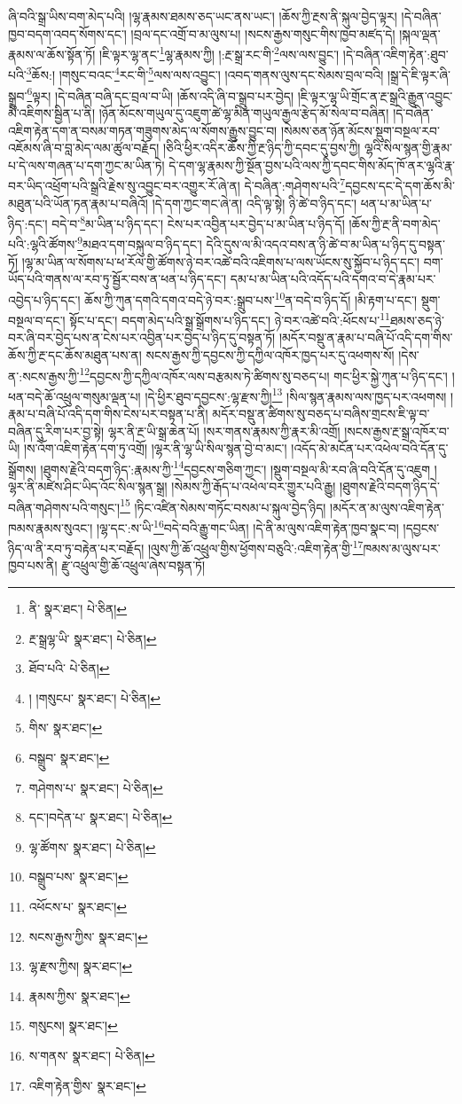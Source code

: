 ཞི་བའི་སྒྲ་ཡིས་བག་མེད་པའི། །ལྷ་རྣམས་ཐམས་ཅད་ཡང་ནས་ཡང་། །ཆོས་ཀྱི་རྔས་ནི་སྐུལ་བྱེད་ལྟར། །དེ་བཞིན་ཁྱབ་བདག་འབད་སོགས་དང་། །བྲལ་དང་འགྲོ་བ་མ་ལུས་པ། །སངས་རྒྱས་གསུང་གིས་ཁྱབ་མཛད་དེ། །སྐལ་ལྡན་རྣམས་ལ་ཆོས་སྟོན་ཏོ། །ཇི་ལྟར་ལྷ་ནང་\footnote{ནི་  སྣར་ཐང་།  པེ་ཅིན། }ལྷ་རྣམས་ཀྱི། །:རྔ་སྒྲ་རང་གི་\footnote{རྔ་སྒྲལྷ་ཡི་  སྣར་ཐང་།  པེ་ཅིན། }ལས་ལས་བྱུང་། །དེ་བཞིན་འཇིག་རྟེན་:ཐུབ་པའི་\footnote{ཐོབ་པའི་  པེ་ཅིན། }ཆོས:། །གསུང་བའང་\footnote{། །གསུངཔ་  སྣར་ཐང་།  པེ་ཅིན། }རང་གི་\footnote{གིས་  སྣར་ཐང་། }ལས་ལས་འབྱུང་། །འབད་གནས་ལུས་དང་སེམས་བྲལ་བའི། །སྒྲ་དེ་ཇི་ལྟར་ཞི་སྒྲུབ་\footnote{བསྒྲུབ་  སྣར་ཐང་། }ལྟར། །དེ་བཞིན་བཞི་དང་བྲལ་བ་ཡི། །ཆོས་འདི་ཞི་བ་སྒྲུབ་པར་བྱེད། །ཇི་ལྟར་ལྷ་ཡི་གྲོང་ན་རྔ་སྒྲའི་རྒྱུན་འབྱུང་མི་འཇིགས་སྦྱིན་པ་ནི། །ཉོན་མོངས་གཡུལ་དུ་འཇུག་ཚེ་ལྷ་མིན་གཡུལ་རྒྱལ་རྩེད་མོ་སེལ་བ་བཞིན། །དེ་བཞིན་འཇིག་རྟེན་དག་ན་བསམ་གཏན་གཟུགས་མེད་ལ་སོགས་རྒྱུས་བྱུང་བ། །སེམས་ཅན་ཉོན་མོངས་སྡུག་བསྔལ་རབ་འཇོམས་ཞི་བ་བླ་མེད་ལམ་ཚུལ་བརྗོད། །ཅིའི་ཕྱིར་འདིར་ཆོས་ཀྱི་རྔ་ཉིད་ཀྱི་དབང་དུ་བྱས་ཀྱི། ལྷའི་སིལ་སྙན་གྱི་རྣམ་པ་དེ་ལས་གཞན་པ་དག་ཀྱང་མ་ཡིན་ཏེ། དེ་དག་ལྷ་རྣམས་ཀྱི་སྔོན་བྱས་པའི་ལས་ཀྱི་དབང་གིས་མོད་ཁོ་ནར་ལྷའི་རྣ་བར་ཡིད་འཕྲོག་པའི་སྒྲའི་རྗེས་སུ་འབྱུང་བར་འགྱུར་རོ་ཞེ་ན། དེ་བཞིན་:གཤེགས་པའི་\footnote{གཤེགས་པ་  སྣར་ཐང་།  པེ་ཅིན། }དབྱངས་དང་དེ་དག་ཆོས་མི་མཐུན་པའི་ཡོན་ཏན་རྣམ་པ་བཞིའོ། །དེ་དག་ཀྱང་གང་ཞེ་ན། འདི་ལྟ་སྟེ། ཉི་ཚེ་བ་ཉིད་དང་། ཕན་པ་མ་ཡིན་པ་ཉིད་:དང་། བདེ་བ་\footnote{དང་།བདེན་པ་  སྣར་ཐང་།  པེ་ཅིན། }མ་ཡིན་པ་ཉིད་དང་། ངེས་པར་འབྱིན་པར་བྱེད་པ་མ་ཡིན་པ་ཉིད་དོ། །ཆོས་ཀྱི་རྔ་ནི་བག་མེད་པའི་:ལྷའི་ཚོགས་\footnote{ལྷ་ཚོགས་  སྣར་ཐང་།  པེ་ཅིན། }མཐའ་དག་བསྐུལ་བ་ཉིད་དང་། དེའི་དུས་ལ་མི་འདའ་བས་ན་ཉི་ཚེ་བ་མ་ཡིན་པ་ཉིད་དུ་བསྟན་ཏོ། །ལྷ་མ་ཡིན་ལ་སོགས་པ་ཕ་རོལ་གྱི་ཚོགས་ཉེ་བར་འཚེ་བའི་འཇིགས་པ་ལས་ཡོངས་སུ་སྐྱོབ་པ་ཉིད་དང་། བག་ཡོད་པའི་གནས་ལ་རབ་ཏུ་སྦྱོར་བས་ན་ཕན་པ་ཉིད་དང་། དམ་པ་མ་ཡིན་པའི་འདོད་པའི་དགའ་བ་དེ་རྣམ་པར་འབྱེད་པ་ཉིད་དང་། ཆོས་ཀྱི་ཀུན་དགའི་དགའ་བདེ་ཉེ་བར་:སྒྲུབ་པས་\footnote{བསྒྲུབ་པས་  སྣར་ཐང་། }ན་བདེ་བ་ཉིད་དོ། །མི་རྟག་པ་དང་། སྡུག་བསྔལ་བ་དང་། སྟོང་པ་དང་། བདག་མེད་པའི་སྒྲ་སྒྲོགས་པ་ཉིད་དང་། ཉེ་བར་འཚེ་བའི་:ཕོངས་པ་\footnote{འཕོངས་པ་  སྣར་ཐང་། }ཐམས་ཅད་ཉེ་བར་ཞི་བར་བྱེད་པས་ན་ངེས་པར་འབྱིན་པར་བྱེད་པ་ཉིད་དུ་བསྟན་ཏོ། །མདོར་བསྡུ་ན་རྣམ་པ་བཞི་པོ་འདི་དག་གིས་ཆོས་ཀྱི་རྔ་དང་ཆོས་མཐུན་པས་ན། སངས་རྒྱས་ཀྱི་དབྱངས་ཀྱི་དཀྱིལ་འཁོར་ཁྱད་པར་དུ་འཕགས་སོ། །དེས་ན་:སངས་རྒྱས་ཀྱི་\footnote{སངས་རྒྱས་ཀྱིས་  སྣར་ཐང་། }དབྱངས་ཀྱི་དཀྱིལ་འཁོར་ལས་བརྩམས་ཏེ་ཚིགས་སུ་བཅད་པ། གང་ཕྱིར་སྐྱེ་ཀུན་པ་ཉིད་དང་། །ཕན་བདེ་ཆོ་འཕྲུལ་གསུམ་ལྡན་པ། །དེ་ཕྱིར་ཐུབ་དབྱངས་:ལྷ་རྫས་ཀྱི།\footnote{ལྷ་རྫས་ཀྱིས།  སྣར་ཐང་། } །སིལ་སྙན་རྣམས་ལས་ཁྱད་པར་འཕགས། །རྣམ་པ་བཞི་པོ་འདི་དག་གིས་ངེས་པར་བསྟན་པ་ནི། མདོར་བསྡུ་ན་ཚིགས་སུ་བཅད་པ་བཞིས་གྲངས་ཇི་ལྟ་བ་བཞིན་དུ་རིག་པར་བྱ་སྟེ། ལྷར་ནི་རྔ་ཡི་སྒྲ་ཆེན་པོ། །སར་གནས་རྣམས་ཀྱི་རྣར་མི་འགྲོ། །སངས་རྒྱས་རྔ་སྒྲ་འཁོར་བ་ཡི། །ས་འོག་འཇིག་རྟེན་དག་ཏུ་འགྲོ། །ལྷར་ནི་ལྷ་ཡི་སིལ་སྙན་བྱེ་བ་མང་། །འདོད་མེ་མངོན་པར་འཕེལ་བའི་དོན་དུ་སྒྲོགས། །ཐུགས་རྗེའི་བདག་ཉིད་:རྣམས་ཀྱི་\footnote{རྣམས་ཀྱིས་  སྣར་ཐང་། }དབྱངས་གཅིག་ཀྱང་། །སྡུག་བསྔལ་མི་རབ་ཞི་བའི་དོན་དུ་འཇུག །ལྷར་ནི་མཛེས་ཤིང་ཡིད་འོང་སིལ་སྙན་སྒྲ། །སེམས་ཀྱི་རྒོད་པ་འཕེལ་བར་གྱུར་པའི་རྒྱུ། །ཐུགས་རྗེའི་བདག་ཉིད་དེ་བཞིན་གཤེགས་པའི་གསུང་།\footnote{གསུངས།  སྣར་ཐང་། } །ཏིང་འཛིན་སེམས་གཏོང་བསམ་པ་སྐུལ་བྱེད་ཉིད། །མདོར་ན་མ་ལུས་འཇིག་རྟེན་ཁམས་རྣམས་སུའང་། །ལྷ་དང་:ས་ཡི་\footnote{ས་གནས་  སྣར་ཐང་།  པེ་ཅིན། }བདེ་བའི་རྒྱུ་གང་ཡིན། །དེ་ནི་མ་ལུས་འཇིག་རྟེན་ཁྱབ་སྣང་བ། །དབྱངས་ཉིད་ལ་ནི་རབ་ཏུ་བརྟེན་པར་བརྗོད། །ལུས་ཀྱི་ཆོ་འཕྲུལ་གྱིས་ཕྱོགས་བཅུའི་:འཇིག་རྟེན་གྱི་\footnote{འཇིག་རྟེན་གྱིས་  སྣར་ཐང་། }ཁམས་མ་ལུས་པར་ཁྱབ་པས་ནི། རྫུ་འཕྲུལ་གྱི་ཆོ་འཕྲུལ་ཞེས་བསྟན་ཏོ། 